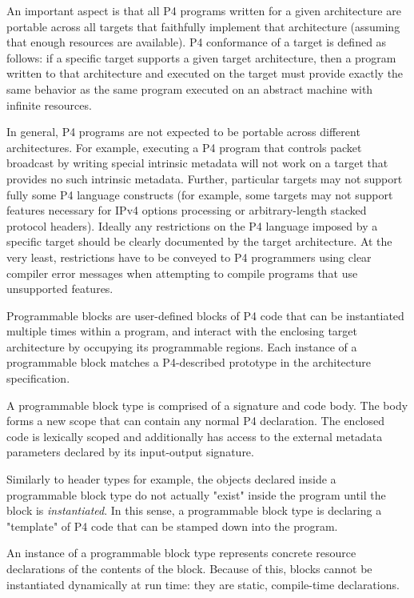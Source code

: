 \documentclass[12pt]{article}
\begin{document}
An important aspect is that all P4 programs written for a given architecture
are portable across all targets that faithfully implement that architecture
(assuming that enough resources are available).  P4 conformance of a target is
defined as follows: if a specific target supports a given target architecture,
then a program written to that architecture and executed on the target must
provide exactly the same behavior as the same program executed on an abstract
machine with infinite resources.

In general, P4 programs are not expected to be portable across different
architectures.  For example, executing a P4 program that controls packet
broadcast by writing special intrinsic metadata will not work on a target that
provides no such intrinsic metadata.  Further, particular targets may not
support fully some P4 language constructs (for example, some targets may not
support features necessary for IPv4 options processing or arbitrary-length
stacked protocol headers).  Ideally any restrictions on the P4 language
imposed by a specific target should be clearly documented by the target
architecture.  At the very least, restrictions have to be conveyed to P4
programmers using clear compiler error messages when attempting to compile
programs that use unsupported features.



Programmable blocks are user-defined blocks of P4 code that can be
instantiated multiple times within a program, and interact with the enclosing
target architecture by occupying its programmable regions.  Each instance
of a programmable block matches a P4-described prototype in the
architecture specification.


A programmable block type is comprised of a signature and code body. The body
forms a new scope that can contain any normal P4 declaration. The enclosed
code is lexically scoped and additionally has access to the external
metadata parameters declared by its input-output signature.

Similarly to header types for example, the objects declared inside a
programmable block type do not actually "exist" inside the program until
the block is \textit{instantiated}.  In this sense, a programmable block
type is declaring a "template" of P4 code that can be stamped down into the
program.


An instance of a programmable block type represents concrete resource
declarations of the contents of the block.  Because of this, blocks cannot
be instantiated dynamically at run time: they are static, compile-time
declarations.
\end{document}
